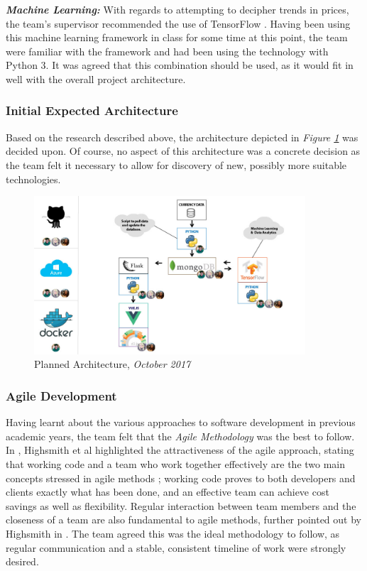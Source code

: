 \textbf{\textit{Machine Learning:}} With regards to attempting to decipher trends in prices, the team's supervisor recommended the use of TensorFlow \cite{tensorflow}. Having been using this machine learning framework in class for some time at this point, the team were familiar with the framework and had been using the technology with Python 3. It was agreed that this combination should be used, as it would fit in well with the overall project architecture.

\subsubsection{Initial Expected Architecture}
Based on the research described above, the architecture depicted in \textit{Figure \ref{initarchitecture}} was decided upon. Of course, no aspect of this architecture was a concrete decision as the team felt it necessary to allow for discovery of new, possibly more suitable technologies.

\newpage

\begin{figure}[h]
    \centering
    \includegraphics[width=0.9\textwidth, keepaspectratio]{img/Architecture.jpg}
    \caption{Planned Architecture, \textit{October 2017}}
    \label{initarchitecture}
\end{figure}

\subsubsection{Agile Development}
Having learnt about the various approaches to software development in previous academic years, the team felt that the \textit{Agile Methodology} \cite{agilemani} was the best to follow. In \cite{agileieee}, Highsmith et al highlighted the attractiveness of the agile approach, stating that working code and a team who work together effectively are the two main concepts stressed in agile methods \cite{agileieee}; working code proves to both developers and clients exactly what has been done, and an effective team can achieve cost savings as well as flexibility. Regular interaction between team members and the closeness of a team are also fundamental to agile methods, further pointed out by Highsmith in \cite{agileieee}. The team agreed this was the ideal methodology to follow, as regular communication and a stable, consistent timeline of work were strongly desired. 

